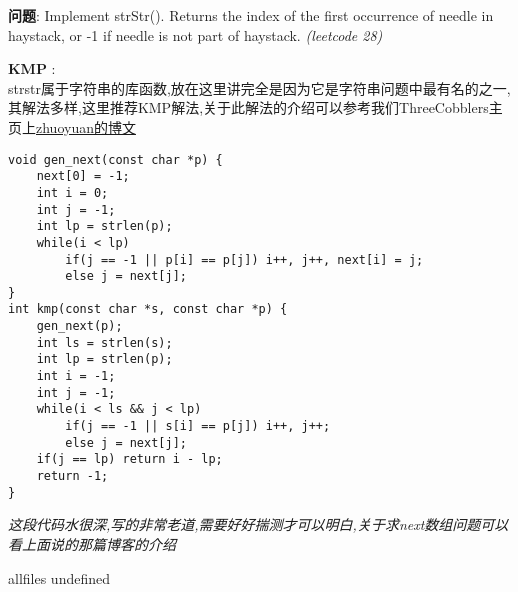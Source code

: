 \documentclass{article}
\begin{document}
\begin{CJK}{UTF8}{gbsn}     %

\else
    
\begin{description}
    \item{\textbf{问题}}: Implement strStr(). Returns the index of the first occurrence of needle in haystack, or -1 if needle is not part of haystack. \textit{(leetcode 28)}
    \item{\textbf{KMP}} : 
    \\strstr属于字符串的库函数,放在这里讲完全是因为它是字符串问题中最有名的之一,其解法多样,这里推荐KMP解法,关于此解法的介绍可以参考我们ThreeCobblers主页上\href{https://github.com/ThreeCobblers/Paladin/blob/master/blog/string/KMP.md}{zhuoyuan的博文}
    \begin{lstlisting}
void gen_next(const char *p) {
    next[0] = -1;
    int i = 0;
    int j = -1;
    int lp = strlen(p);
    while(i < lp)
        if(j == -1 || p[i] == p[j]) i++, j++, next[i] = j;
        else j = next[j];
}
int kmp(const char *s, const char *p) {
    gen_next(p);
    int ls = strlen(s);
    int lp = strlen(p);
    int i = -1;
    int j = -1;
    while(i < ls && j < lp)
        if(j == -1 || s[i] == p[j]) i++, j++;
        else j = next[j];
    if(j == lp) return i - lp;
    return -1;
}
    \end{lstlisting}
    \textit{这段代码水很深,写的非常老道,需要好好揣测才可以明白,关于求next数组问题可以看上面说的那篇博客的介绍}
\end{description}

\fi

\ifx allfiles undefined
\end{CJK}
\end{document}
